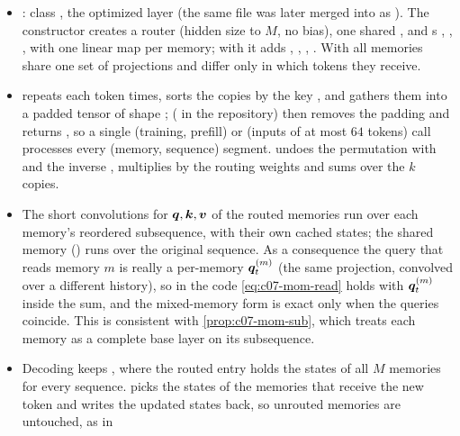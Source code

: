 \begin{implnote}[title={In the code: \texttt{OpenSparseLLMs/MoM}}]
\begin{itemize}
\item {}: class , the
  optimized layer (the same file was later merged into \fla{} as
  ). The constructor creates a router  (hidden size to
  $M$, no bias), one shared , and s , ,
  ,  with one linear map per memory; with  it adds
  , , , . With
   all memories share one set of projections and differ only in
  which tokens they receive.
\item {} repeats each token  times, sorts the copies by the key
  , and gathers them into a padded tensor of shape
  ;  ( in
  the repository) then removes the padding and returns , so a single
   (training, prefill) or 
  (inputs of at most $64$ tokens) call processes every (memory, sequence) segment.
   undoes the permutation with  and the inverse
  , multiplies by the routing weights and sums over the $k$ copies.
\item The short convolutions for $\bm{q},\bm{k},\bm{v}$ of the routed memories run over each
  memory's reordered subsequence, with their own cached states; the shared memory
  () runs over the original sequence. As a consequence the query that reads
  memory $m$ is really a per-memory $\bm{q}_t^{(m)}$ (the same projection, convolved over a
  different history), so in the code \cref{eq:c07-mom-read} holds with $\bm{q}_t^{(m)}$ inside the
  sum, and the mixed-memory form is exact only when the queries coincide. This is consistent
  with \cref{prop:c07-mom-sub}, which treats each memory as a complete base layer on its subsequence.
\item Decoding keeps , where the routed entry holds the
  states of all $M$ memories for every sequence.  picks the
  states of the memories that receive the new token and 
  writes the updated states back, so unrouted memories are untouched, as in

\end{itemize}
\end{implnote}
